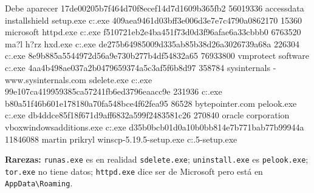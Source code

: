 \documentclass[11pt,a4paper]{article}
\begin{document}
\begin{salida}{Debe aparecer}
17de00205b7f464d70f8ecef14d7d1609b365fb2        56019336        accessdata      installshield setup.exe c:\users\gregor\desktop\ftk.exe
409aea9461d03bff3e006d3e7e7c4790a0862170        15360   microsoft       httpd.exe       c:\users\gregor\appdata\roaming\microsoft\windows\httpd.exe
f510721eb2e4ba451f73d0d3f96afae6a33cbbb0        6763520 ma?l h?rz       hxd.exe c:\users\gregor\desktop\hxd.exe
de275b64985009d335ab85b38d26a3026739a68a        226304                  c:\users\gregor\downloads\inject.exe
8e9b885a5544972d56a9e730b277b4df54832a65        76933800        vmprotect software                                                      c:\users\gregor\appdata\local\microsoft\packed.exe
4aa4b498ae037a2b0479659374a5c3af5f6b8d97        358784  sysinternals - www.sysinternals.com     sdelete.exe     c:\users\gregor\appdata\runas.exe
99e107ca419959385ca57241fb6ed3796eaacc9e        231936                  c:\users\gregor\appdata\local\temp\tor.exe
b80a51f46b601e178180a70fa548bce4f62fea95        86528   bytepointer.com pelook.exe      c:\users\gregor\appdata\local\microsoft\uninstall.exe
db4ddce85f18f671d9aff6832a599f2483581c26        270840  oracle corporation      vboxwindowsadditions.exe        c:\users\gregor\downloads\vboxwindowsadditions.exe
d35b0bcb01d0a10b0bb814e7b771bab77b99944a        11846088        martin prikryl                                                  winscp-5.19.5-setup.exe                                 c:\users\gregor\downloads{}.5-setup.exe
\end{salida}
\begin{nota}\textbf{Rarezas:} \texttt{runas.exe} es en realidad \texttt{sdelete.exe}; \texttt{uninstall.exe} es \texttt{pelook.exe}; \texttt{tor.exe} no tiene datos; \texttt{httpd.exe} dice ser de Microsoft pero está en \texttt{AppData\textbackslash{}Roaming}.\end{nota}
\end{document}
